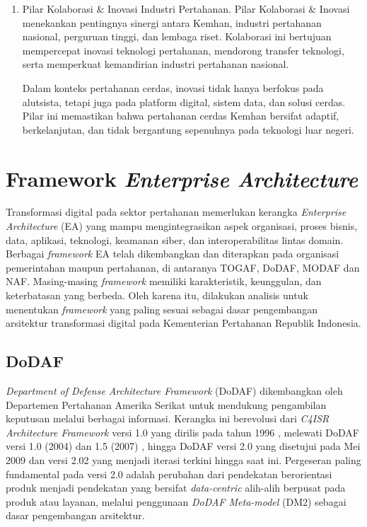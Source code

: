 \begin{enumerate}
  \item Pilar Kolaborasi \& Inovasi Industri Pertahanan.
  Pilar Kolaborasi \& Inovasi menekankan pentingnya sinergi antara Kemhan, industri pertahanan nasional, perguruan tinggi, dan lembaga riset.
  Kolaborasi ini bertujuan mempercepat inovasi teknologi pertahanan, mendorong transfer teknologi, serta memperkuat kemandirian industri pertahanan nasional.

  Dalam konteks pertahanan cerdas, inovasi tidak hanya berfokus pada alutsista, tetapi juga pada platform digital, sistem data, dan solusi cerdas.
  Pilar ini memastikan bahwa pertahanan cerdas Kemhan bersifat adaptif, berkelanjutan, dan tidak bergantung sepenuhnya pada teknologi luar negeri.
\end{enumerate}

\section{Framework \textit{Enterprise Architecture}}
Transformasi digital pada sektor pertahanan memerlukan kerangka \textit{Enterprise Architecture} (EA) yang mampu mengintegrasikan aspek organisasi, proses bisnis, data, aplikasi, teknologi, keamanan siber, dan interoperabilitas lintas domain.
Berbagai \textit{framework} EA telah dikembangkan dan diterapkan pada organisasi pemerintahan maupun pertahanan, di antaranya TOGAF, DoDAF, MODAF dan NAF.
Masing-masing \textit{framework} memiliki karakteristik, keunggulan, dan keterbatasan yang berbeda.
Oleh karena itu, dilakukan analisis untuk menentukan \textit{framework} yang paling sesuai sebagai dasar pengembangan arsitektur transformasi digital pada Kementerian Pertahanan Republik Indonesia.

\subsection{DoDAF}
\textit{Department of Defense Architecture Framework} (DoDAF) dikembangkan oleh Departemen Pertahanan Amerika Serikat untuk mendukung pengambilan keputusan melalui berbagai informasi.
Kerangka ini berevolusi dari \textit{C4ISR Architecture Framework} versi 1.0 yang dirilis pada tahun 1996 \autocite{C4ISRAWG1998}, melewati DoDAF versi 1.0 (2004) dan 1.5 (2007) \autocite{DoDAF2007v15}, hingga DoDAF versi 2.0 \autocite{DoDAF2010v20} yang disetujui pada Mei 2009 dan versi 2.02 \autocite{DoDAF2011v202} yang menjadi iterasi terkini hingga saat ini.
Pergeseran paling fundamental pada versi 2.0 adalah perubahan dari pendekatan berorientasi produk menjadi pendekatan yang bersifat \textit{data-centric} alih-alih berpusat pada produk atau layanan, melalui penggunaan \textit{DoDAF Meta-model} (DM2) sebagai dasar pengembangan arsitektur.

